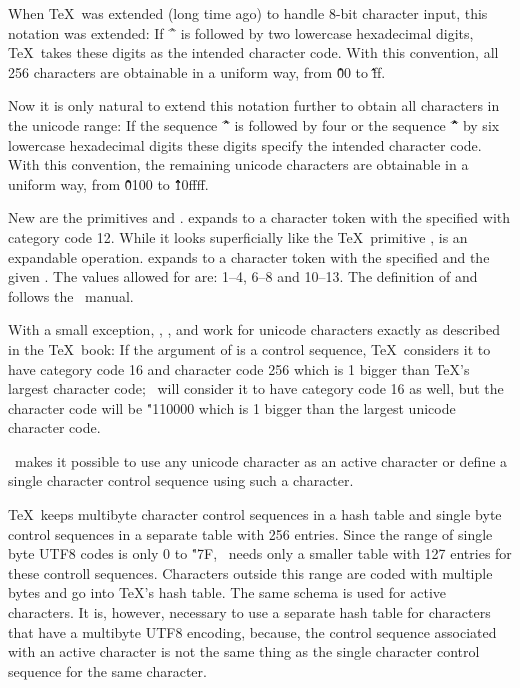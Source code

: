 When \TeX\ was extended (long time ago) to handle 8-bit character input,
this notation was extended: If \.{ \^\^} is followed by two lowercase hexadecimal digits,
\TeX\ takes these digits as the intended character code. With this convention, all 256 characters are
obtainable in a uniform way, from \.{\^\^00} to \.{\^\^ff}.

Now it is only natural to extend this notation further to obtain all characters in the unicode range:
If the sequence \.{ \^\^\^\^} is followed by four or the  sequence \.{ \^\^\^\^\^\^} by six
lowercase hexadecimal digits these digits specify the intended character code.
With this convention, the remaining unicode characters are
obtainable in a uniform way, from \.{\^\^\^\^0100} to \.{\^\^\^\^\^\^10ffff}.


New are the primitives  and .
 expands to a
character token with the specified  with
category code 12. While it looks superficially like the \TeX\ primitive
,  is an expandable operation.
  expands to a
character token with the specified 
and the given . The values allowed
for  are: 1--4, 6--8 and 10--13.
The definition of  and  follows the \XeTeX\ manual.


With a small exception, , , and 
work for unicode characters exactly as described in the \TeX\ book:
If the argument of  is a control sequence,
\TeX\ considers it to have category code 16
and character code 256 which is 1 bigger than \TeX's largest character code;
\HiTeX\ will consider it to have category code 16 as well, but the
character code will be \.{"110000} which is 1 bigger than the largest
unicode character code.

\HiTeX\ makes it possible to use any unicode character as an active character or
define a single character control sequence using such a character.

\TeX\ keeps multibyte character control sequences in a hash table and
single byte control sequences in a separate table with 256 entries.
Since the range of single byte UTF8 codes is only 0 to \.{"7F},
\HiTeX\ needs only a smaller table with 127 entries for these controll sequences.
Characters outside this range are coded with multiple bytes and go
into \TeX's hash table. The same schema is used for active characters.
It is, however, necessary to use a separate hash table for characters
that have a multibyte UTF8 encoding, because, the control sequence associated
with an active character is not the same thing as the single character
control sequence for the same character.

